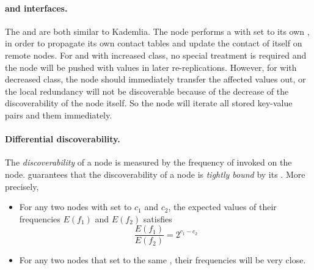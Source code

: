 \paragraph{{\normalfont\fboot} and {\normalfont\fupdate} interfaces.}
The \fboot and \fupdate are both similar to Kademlia.
The node performs a \ffind with  set to its own \vid, in order to propagate its own contact tables and update the contact of itself on remote nodes.
For \fboot and \fupdate with increased class, no special treatment is required and the node will be pushed with values in later re-replications.
However, for \fupdate with decreased class, the node should immediately transfer the affected values out, or the local redundancy will not be discoverable because of the decrease of the discoverability of the node itself.
So the node will iterate all stored key-value pairs and \fput them immediately.

\paragraph{Differential discoverability.}
The \emph{discoverability} of a node is measured by the frequency of \fpush invoked on the node.
\dht guarantees that the discoverability of a node is \emph{tightly bound} by its \vclass.
More precisely,
\begin{itemize}
    \item For any two nodes with \vclass set to $c_1$ and $c_2$, the expected values of their frequencies $E(f_1)$ and $E(f_2)$ satisfies
    \[ \frac{E(f_1)}{E(f_2)}=2^{c_1-c_2} \]
    \item For any two nodes that set to the same \vclass, their frequencies will be very close.
\end{itemize}
